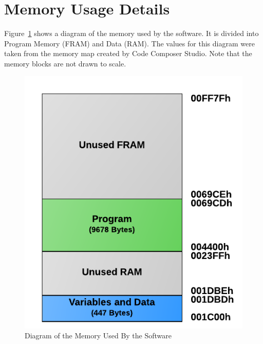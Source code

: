 \section{Memory Usage Details}

Figure~\ref{fig:memoryMap} shows a diagram of the memory used by the software.  It is divided into Program Memory (FRAM) and Data (RAM).  The values for this diagram were taken from the memory map created by Code Composer Studio.  Note that the memory blocks are not drawn to scale.

\begin{figure}[ht]
	\centering
	\includegraphics[scale=0.95]{img/MemoryMap}
	\caption{Diagram of the Memory Used By the Software\label{fig:memoryMap}}
\end{figure}
